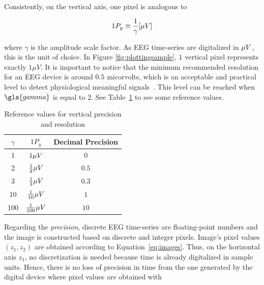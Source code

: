 Consistently, on the vertical axis, one pixel is analogous to 

\begin{equation}
1 P_y \equiv \frac{1}{\gamma}  [\si\mu{V}]
\label{eq:resolutiony}
\end{equation}

\noindent where $\gamma$ is the amplitude scale factor.  As EEG time-series are digitalized in $\si\mu{V}$, this is the unit of choice.  In Figure \ref{fig:plottingsample}, $1$ vertical pixel represents exactly $1 \mu V$.  It is important to notice that the minimum recommended resolution for an EEG device is around $0.5$ micorvolts, which is an acceptable and practical level to detect physiological meaningful signals~\cite{Schomer2010}.  This level can be reached when $\gls{gamma}$ is equal to $2$.  See Table~\ref{tab:precisiony} to see some reference values.

\begin{table}[htb]
\caption[Reference Values for Vertical Precision and Resolution]{Reference values for vertical precision and resolution}
\centering
\vspace{8pt}
\begin{tabular}{|c|c|c|}
\toprule
\textbf{$\gamma$}	&  $1 P_y$ 	&  Decimal Precision   \\
\midrule
1     &     $1 \si\mu{V}$   &  $0$                                      \\
2    &     $\frac{1}{2} \si\mu{V}$   &  $0.5$         \\
3     &     $\frac{1}{3} \si\mu{V}$   &  $0.3$   \\
10     &     $\frac{1}{10} \si\mu{V}$   &  $1$         \\
100     &     $\frac{1}{100} \si\mu{V}$   &  $10$    \\
\bottomrule
\end{tabular}
\label{tab:precisiony}
\end{table}

Regarding the \textit{precision}, discrete EEG time-series are floating-point numbers and the image is constructed based on discrete and integer pixels.  Image's pixel values $(z_1,z_2)$ are obtained according to Equation~\ref{eq:images}.  Thus, on the horizontal axis $z_1$, no discretization is needed because time is already digitalized in sample units. Hence, there is no loss of precision in time from the one generated by the digital device where pixel values are obtained with

